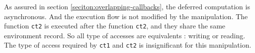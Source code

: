As assured in section \ref{seciton:overlapping-callbacks}, the deferred computation is asynchronous.
And the execution flow is not modified by the manipulation.
The function \texttt{ct2} is executed after the function \texttt{ct2}, and they share the same environment record.
So all type of accesses are equivalents : writing or reading.
The type of access required by \texttt{ct1} and \texttt{ct2} is insignificant for this manipulation.




























